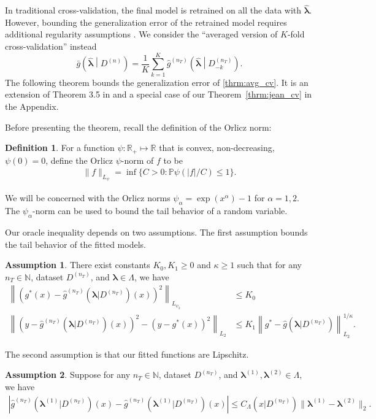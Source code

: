 \documentclass[12pt]{article} %
\theoremstyle{definition}
\newtheorem{definition}{Definition}
\newtheorem{assump}{Assumption}
\begin{document}
In traditional cross-validation, the final model is retrained on all the data with $\hat{\boldsymbol{\lambda}}$. However, bounding the generalization error of the retrained model requires additional regularity assumptions \citep{lecue2012oracle}. We consider the ``averaged version of $K$-fold cross-validation'' instead
\begin{equation}
\label{thrm:avg_cv}
\bar{g}\left ( \hat{\boldsymbol \lambda} \middle | {D^{(n)}} \right ) = 
\frac{1}{K} \sum_{k=1}^K 
\hat{g}^{(n_T)} \left (\hat{\boldsymbol \lambda} \middle | D^{(n_T)}_{-k} \right ).
\end{equation}
The following theorem bounds the generalization error of \eqref{thrm:avg_cv}.
It is an extension of Theorem 3.5 in \citet{lecue2012oracle} and a special case of our Theorem~\ref{thrm:jean_cv} in the Appendix.

Before presenting the theorem, recall the definition of the Orlicz norm:
\begin{definition}
	For a function $\psi: \mathbb{R}_+ \mapsto \mathbb{R}$ that is convex, non-decreasing, $\psi(0) = 0$, define the Orlicz $\psi$-norm of $f$ to be
	\begin{align}
	\|f\|_{L_\psi} = \inf \{C > 0: \mathbb{P}\psi(|f|/C) \le 1\}.
	\end{align}
\end{definition}
\noindent We will be concerned with the Orlicz norms $\psi_\alpha = \exp(x^\alpha) - 1 $ for $\alpha = 1, 2$.
The $\psi_\alpha$-norm can be used to bound the tail behavior of a random variable.

Our oracle inequality depends on two assumptions.
The first assumption bounds the tail behavior of the fitted models.
\begin{assump}
	\label{assump:tail_margin}
	There exist constants $K_0, K_1 \ge 0$ and $\kappa \ge 1$ such that for any $n_T \in \mathbb{N}$, dataset $D^{(n_T)}$, and $\boldsymbol{\lambda} \in \Lambda$, we have
	\begin{align}
	\left \|
	\left(
	g^* (x) - \hat{g}^{(n_T)}(\boldsymbol{\lambda} | D^{(n_T)})(x)
	\right)^2
	\right \|_{L_{\psi_2}} & \le K_0
	\label{eq:cv_assump1}\\
	\left \|
	\left(
	y - \hat{g}^{(n_T)}(\boldsymbol{\lambda} | D^{(n_T)})(x)
	\right)^2
	- \left(
	y - g^*(x)
	\right)^2
	\right \|_{L_2}
	& \le 
	K_1 \left \|
	g^{*}-\hat{g}(\boldsymbol{\lambda}|D^{(n_{T})})
	\right \|_{L_{2}}^{1/\kappa}.
	\label{eq:cv_assump2}
	\end{align}
\end{assump}
\noindent The second assumption is that our fitted functions are Lipschitz.
\begin{assump}
	\label{assump:lipschitz}
	Suppose for any $n_T \in \mathbb{N}$, dataset $D^{(n_T)}$, and $\boldsymbol{\lambda}^{(1)}, \boldsymbol{\lambda}^{(2)} \in \Lambda$, we have
	\begin{align}
	\left |\hat{g}^{(n_T)}(\boldsymbol{\lambda}^{(1)}|D^{(n_T)})(x) - \hat{g}^{(n_T)}(\boldsymbol{\lambda}^{(1)}|D^{(n_T)})(x) \right | \le C_\Lambda(x|D^{(n_T)}) \|\boldsymbol{\lambda}^{(1)} - \boldsymbol{\lambda}^{(2)}\|_2.
	\end{align}
\end{assump}
\end{document}
